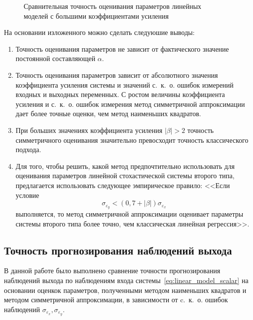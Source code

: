 \begin{figure}[p]
  \vspace{\baselineskip}
  \caption{%
    Сравнительная точность оценивания параметров линейных \\
    моделей с большими коэффициентами усиления
  }\label{fig:comparison_linear_params_beta-big}
\end{figure}

\pagebreak
На основании изложенного можно сделать следуюшие выводы:
\begin{enumerate}
\item Точность оценивания параметров не зависит от фактического значение постоянной
  составляющей \( \alpha \).
\item Точность оценивания параметров зависит от абсолютного значения коэффициента усиления системы и
  значений с.~к.~о. ошибок измерений входных и выходных переменных.
  С ростом величины коэффициента усиления и с.~к.~о. ошибок измерения
  метод симметричной аппроксимации дает более точные оценки,
  чем метод наименьших квадратов.
\item При больших значениях коэффициента усиления \( |\beta| > 2 \)
  точность симметричного оценивания значительно превосходит
  точность классического подхода.
\item Для того, чтобы решить, какой метод предпочтительно использовать для оценивания параметров
  линейной стохастической системы второго типа,
  предлагается использовать следующее эмпирическое правило:
  <<Если условие
  \begin{equation}
    \sigma_{\varepsilon_y} < (0{,}7 + |\beta|) \sigma_{\varepsilon_x}
    \label{eq:rule_linear_param}
  \end{equation}
  выполняется, то метод симметричной аппроксимации оценивает параметры системы
  второго типа более точно, чем классическая линейная регрессия>>.
\end{enumerate}

\pagebreak
\subsection{Точность прогнозирования наблюдений выхода}

В данной работе было выполнено сравнение точности прогнозирования наблюдений выхода по
наблюдениям входа системы~\eqref{eq:linear_model_scalar} на основании оценкок параметров,
полученными методом наименьших квадратов и методом симметричной аппроксимации,
в зависимости от c.~к.~о. ошибок наблюдений \( \sigma_{\varepsilon_x}, \sigma_{\varepsilon_y} \).

